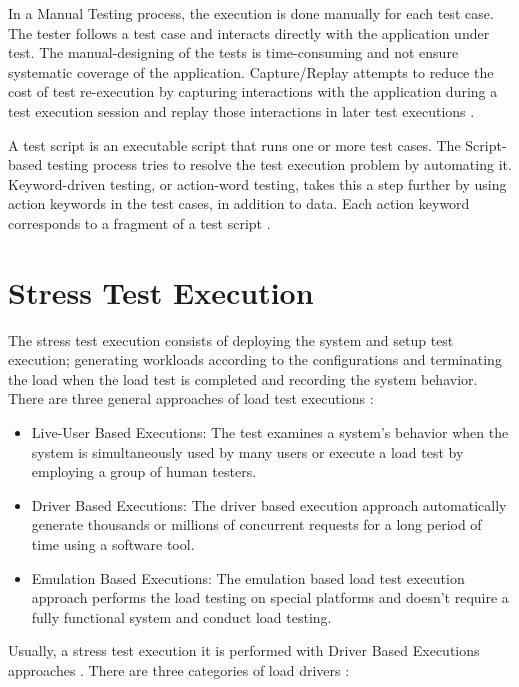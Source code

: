 \documentclass[espaco=umemeio,chapter=TITLE,twoside,openright]{abnt}
\begin{document}
In a Manual Testing process, the execution is done manually for each test case. The tester follows a test case and interacts directly with the application under test. The manual-designing of the tests is time-consuming and not ensure systematic coverage of the application. Capture/Replay attempts to reduce the cost of test re-execution by capturing interactions with the application during a test execution session and replay those interactions in later test executions \cite{utting2010practical}.

A test script is an executable script that runs one or more test cases. The Script-based testing process tries to resolve the test execution problem by automating it. Keyword-driven testing, or action-word testing, takes this a step further by using action keywords in the test cases, in addition to data. Each action keyword corresponds to a fragment of a test script \cite{utting2010practical}.


\section{Stress Test Execution}

The stress test execution consists of deploying the system and setup test execution; generating workloads according to the configurations and terminating the load when the load test is completed and recording the system behavior. There are three general approaches of load test executions \cite{Molyneaux2009}\cite{Jiang2010}:

\begin{itemize}
\item Live-User Based Executions: The test examines a system’s behavior when the system is simultaneously used by many users or execute a load test by employing a group of human testers.
\item Driver Based Executions: The driver based execution approach automatically generate thousands or millions of concurrent requests for a long period of time using a software tool.
\item Emulation Based Executions: The emulation based load test execution approach performs the load testing on special platforms and doesn't require a fully functional system and conduct load testing.
\end{itemize}

Usually, a stress test execution it is performed with Driver Based Executions approaches \cite{Erinle2013} \cite{MohammadS.Obaidat} \cite{Wang2013}. There are three categories of load drivers \cite{Jiang2010}:
\end{document}
